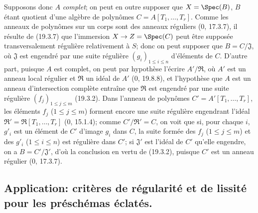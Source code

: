 Supposons donc $A$ \emph{complet}; on peut en outre supposer que $X=\Spec(B)$, $B$ étant quotient d'une algèbre de polynômes $C=A[T_1,\ldots,T_r]$. Comme les anneaux de polynômes sur un corps sont des anneaux réguliers ($0$, 17.3.7), il résulte de (19.3.7) que l'immersion $X\to Z=\Spec(C)$ peut être supposée transversalement régulière relativement à $S$; donc on peut supposer que $B=C/\mathfrak J$, où $\mathfrak J$ est engendré par une suite régulière $(g_i)_{1\leq i\leq n}$ d'éléments de $C$. D'autre part, puisque $A$ est complet, on peut par hypothèse l'écrire $A'/\mathfrak R$, où $A'$ est un anneau local régulier et $\mathfrak R$ un idéal de $A'$ ($0$, 19.8.8), et l'hypothèse que $A$ est un anneau d'intersection complète entraîne que $\mathfrak R$ est engendré par une suite régulière $(f_j)_{1\leq j\leq m}$ (19.3.2). Dans l'anneau de polynômes $C'=A'[T_1,\ldots,T_r]$, les éléments $f_j$ ($1\leq j\leq m$) forment encore une suite régulière engendrant l'idéal $\mathfrak R'=\mathfrak R[T_1,\ldots,T_r]$ ($0$, 15.1.4); comme $C'/\mathfrak R'=C$, on voit que si, pour chaque $i$, $g'_i$ est un élément de $C'$ d'image $g_i$ dans $C$, la suite formée des $f_j$ ($1\leq j\leq m$) et des $g'_i$ ($1\leq i\leq n$) est régulière dans $C'$; si $\mathfrak J'$ est l'idéal de $C'$ qu'elle engendre, on a $B=C'/\mathfrak J'$, d'où la conclusion en vertu de (19.3.2), puisque $C'$ est un anneau régulier ($0$, 17.3.7).

\subsection{Application: critères de régularité et de lissité pour les préschémas éclatés.}
\label{subsection:IV.19.4}


